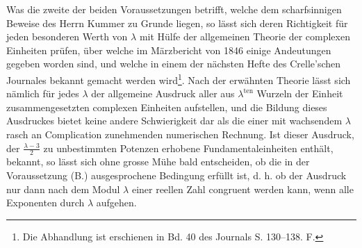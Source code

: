 \documentclass[11pt]{article}
\begin{document}
Was die zweite der beiden Voraussetzungen betrifft, welche dem scharfsinnigen Beweise des Herrn Kummer zu Grunde liegen, so lässt sich deren Richtigkeit für jeden besonderen Werth von $\lambda$ mit Hülfe der allgemeinen Theorie der complexen Einheiten prüfen, über welche im Märzbericht von 1846 einige Andeutungen gegeben worden sind, und welche in einem der nächsten Hefte des Crelle'schen Journales bekannt gemacht werden wird\footnote{Die Abhandlung ist erschienen in Bd. 40 des Journals S. 130--138. \textnormal{F.}}. Nach der erwähnten Theorie lässt sich nämlich für jedes $\lambda$ der allgemeine Ausdruck aller aus $\lambda^{\mathrm{ten}}$ Wurzeln der Einheit zusammengesetzten complexen Einheiten aufstellen, und die Bildung dieses Ausdruckes bietet keine andere Schwierigkeit dar als die einer mit wachsendem $\lambda$ rasch an Complication zunehmenden numerischen Rechnung. Ist dieser Ausdruck, der $\frac{\lambda-3}{2}$ zu unbestimmten Potenzen erhobene Fundamentaleinheiten enthält, bekannt, so lässt sich ohne grosse Mühe bald entscheiden, ob die in der Voraussetzung (B.) ausgesprochene Bedingung erfüllt ist, d. h. ob der Ausdruck nur dann nach dem Modul $\lambda$ einer reellen Zahl congruent werden kann, wenn alle Exponenten durch $\lambda$ aufgehen.
\end{document}
